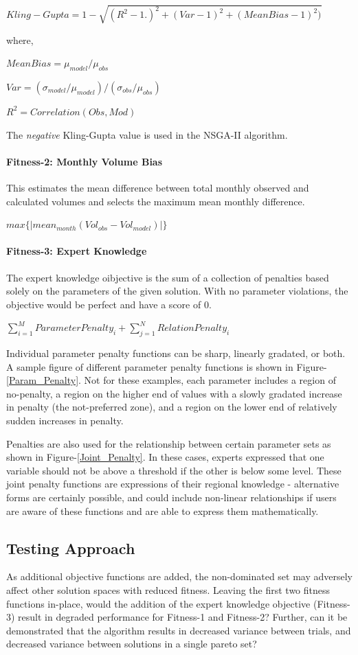 \documentclass[11pt]{article} %
\begin{document}
$Kling-Gupta=1-\sqrt{(R^2-1.)^2+(Var-1)^2+(MeanBias-1)^2)}$

where,

$MeanBias=\mu_{model}/\mu_{obs}$

$Var= (\sigma_{model}/\mu_{model})/(\sigma_{obs}/\mu_{obs})$

$R^2=Correlation(Obs,Mod)$

The \emph{negative} Kling-Gupta value is used in the NSGA-II algorithm.

\paragraph{Fitness-2: Monthly Volume Bias} This estimates the mean difference between total monthly observed and calculated volumes and selects the maximum mean monthly difference. 

$max\{|mean_{month}(Vol_{obs}-Vol_{model})|\}$

\paragraph{Fitness-3: Expert Knowledge} The expert knowledge oibjective is the sum of a collection of penalties based solely on the parameters of the given solution. With no parameter violations, the objective would be perfect and have a score of $0$. 

$\sum_{i=1}^M ParameterPenalty_i + \sum_{j=1}^N RelationPenalty_i$

Individual parameter penalty functions can be sharp, linearly gradated, or both. A sample figure of different parameter penalty functions is shown in Figure-\ref{Param_Penalty}. Not for these examples, each parameter includes a region of no-penalty, a region on the higher end of values with a slowly gradated increase in penalty (the not-preferred zone), and a region on the lower end of relatively sudden increases in penalty. 

Penalties are also used for the relationship between certain parameter sets as shown in Figure-\ref{Joint_Penalty}. In these cases, experts expressed that one variable should not be above a threshold if the other is below some level. These joint penalty functions are expressions of their regional knowledge - alternative forms are certainly possible, and could include non-linear relationships if users are aware of these functions and are able to express them mathematically.

\subsection{Testing Approach}
As additional objective functions are added, the non-dominated set may adversely affect other solution spaces with reduced fitness. Leaving the first two fitness functions in-place, would the addition of the expert knowledge objective (Fitness-3) result in degraded performance for Fitness-1 and Fitness-2? Further, can it be demonstrated that the algorithm results in decreased variance between trials, and decreased variance between solutions in a single pareto set?
\end{document}
